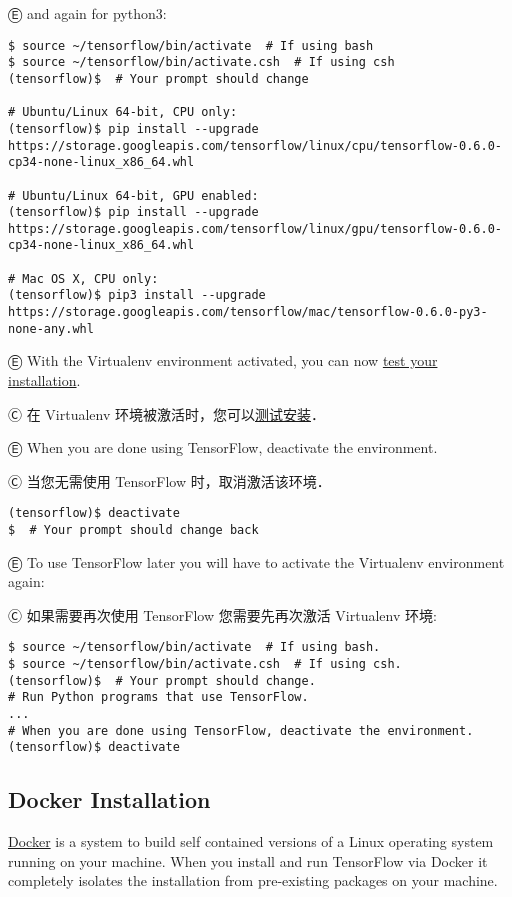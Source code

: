 Ⓔ and again for python3:

\begin{lstlisting}
$ source ~/tensorflow/bin/activate  # If using bash
$ source ~/tensorflow/bin/activate.csh  # If using csh
(tensorflow)$  # Your prompt should change

# Ubuntu/Linux 64-bit, CPU only:
(tensorflow)$ pip install --upgrade https://storage.googleapis.com/tensorflow/linux/cpu/tensorflow-0.6.0-cp34-none-linux_x86_64.whl

# Ubuntu/Linux 64-bit, GPU enabled:
(tensorflow)$ pip install --upgrade https://storage.googleapis.com/tensorflow/linux/gpu/tensorflow-0.6.0-cp34-none-linux_x86_64.whl

# Mac OS X, CPU only:
(tensorflow)$ pip3 install --upgrade https://storage.googleapis.com/tensorflow/mac/tensorflow-0.6.0-py3-none-any.whl
\end{lstlisting}

Ⓔ \textcolor{etc}{With the Virtualenv environment activated, you can now \hyperref[test_install]{test your installation}.}

Ⓒ 在 Virtualenv 环境被激活时，您可以\hyperref[test_install]{测试安装}．

Ⓔ \textcolor{etc}{When you are done using TensorFlow, deactivate the environment.}

Ⓒ 当您无需使用 TensorFlow 时，取消激活该环境．

\begin{lstlisting}
(tensorflow)$ deactivate
$  # Your prompt should change back
\end{lstlisting}

Ⓔ \textcolor{etc}{To use TensorFlow later you will have to activate the Virtualenv environment again:}

Ⓒ 如果需要再次使用 TensorFlow 您需要先再次激活 Virtualenv 环境:

\begin{lstlisting}
$ source ~/tensorflow/bin/activate  # If using bash.
$ source ~/tensorflow/bin/activate.csh  # If using csh.
(tensorflow)$  # Your prompt should change.
# Run Python programs that use TensorFlow.
...
# When you are done using TensorFlow, deactivate the environment.
(tensorflow)$ deactivate
\end{lstlisting}


%
\subsection {Docker Installation} \label{docker_install}
\href{http://docker.com/}{Docker} is a system to build self contained versions of a Linux operating system running on your machine. When you install and run TensorFlow via Docker it completely isolates the installation from pre-existing packages on your machine.

